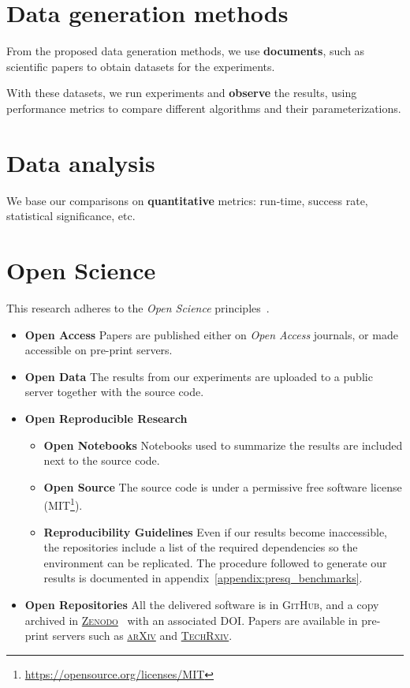 

\section{Data generation methods}
From the proposed data generation methods, we use \textbf{documents},
such as scientific papers to obtain datasets for the experiments.

With these datasets, we run experiments and \textbf{observe} the results,
using performance metrics to compare different algorithms and their parameterizations.

\section{Data analysis}
We base our comparisons on \textbf{quantitative} metrics: run-time, success rate,
statistical significance, etc.

\section{Open Science}
This research adheres to the \emph{Open Science} principles~\cite{oro44719}.

\begin{itemize}
    \item \textbf{Open Access} Papers are published either on \emph{Open Access} journals,
        or made accessible on pre-print servers.
    \item \textbf{Open Data} The results from our experiments are uploaded to a public server together with the source code.
    \item \textbf{Open Reproducible Research} 
        \begin{itemize}
            \item \textbf{Open Notebooks} Notebooks used to summarize the results are
                included next to the source code.
            \item \textbf{Open Source} The source code is under a permissive free software license
                (MIT\footnote{\url{https://opensource.org/licenses/MIT}}).
            \item \textbf{Reproducibility Guidelines} Even if our results become
            inaccessible, the repositories include a list of the required dependencies so the
            environment can be replicated. The procedure followed to generate our results is documented in appendix~\ref{appendix:presq_benchmarks}.
        \end{itemize}
    \item \textbf{Open Repositories} All the delivered software is in \textsc{GitHub},
        and a copy archived in \href{https://zenodo.org/}{\textsc{Zenodo}}~\cite{zenodo} with an
        associated DOI. Papers are available in pre-print servers such as
        \href{https://arxiv.org/}{\textsc{arXiv}} and
        \href{https://www.techrxiv.org}{\textsc{TechRxiv}}.
\end{itemize}
